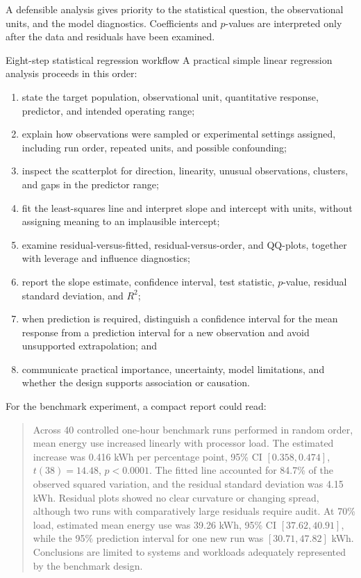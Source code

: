 A defensible analysis gives priority to the statistical question, the observational units, and the model diagnostics. Coefficients and $p$-values are interpreted only after the data and residuals have been examined.

\begin{custombox}{Eight-step statistical regression workflow}
A practical simple linear regression analysis proceeds in this order:
\begin{enumerate}
  \item state the target population, observational unit, quantitative response, predictor, and intended operating range;
  \item explain how observations were sampled or experimental settings assigned, including run order, repeated units, and possible confounding;
  \item inspect the scatterplot for direction, linearity, unusual observations, clusters, and gaps in the predictor range;
  \item fit the least-squares line and interpret slope and intercept with units, without assigning meaning to an implausible intercept;
  \item examine residual-versus-fitted, residual-versus-order, and QQ-plots, together with leverage and influence diagnostics;
  \item report the slope estimate, confidence interval, test statistic, $p$-value, residual standard deviation, and $R^2$;
  \item when prediction is required, distinguish a confidence interval for the mean response from a prediction interval for a new observation and avoid unsupported extrapolation; and
  \item communicate practical importance, uncertainty, model limitations, and whether the design supports association or causation.
\end{enumerate}
\end{custombox}

\newpage
For the benchmark experiment, a compact report could read:

\begin{quote}
Across 40 controlled one-hour benchmark runs performed in random order, mean energy use increased linearly with processor load. The estimated increase was 0.416 kWh per percentage point, 95\% CI $[0.358,0.474]$, $t(38)=14.48$, $p<0.0001$. The fitted line accounted for 84.7\% of the observed squared variation, and the residual standard deviation was 4.15 kWh. Residual plots showed no clear curvature or changing spread, although two runs with comparatively large residuals require audit. At 70\% load, estimated mean energy use was 39.26 kWh, 95\% CI $[37.62,40.91]$, while the 95\% prediction interval for one new run was $[30.71,47.82]$ kWh. Conclusions are limited to systems and workloads adequately represented by the benchmark design.
\end{quote}

